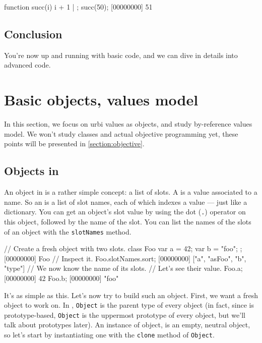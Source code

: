 \begin{urbiscript}
function succ(i) { i + 1 } | {};
succ(50);
[00000000] 51
\end{urbiscript}

\section{Conclusion}

You're now up and running with basic \us code, and we can dive in
details into advanced \us code.

\chapter{Basic objects, \us values model} %

In this section, we focus on urbi values as objects, and study \us
by-reference values model. We won't study classes and actual objective
programming yet, these points will be presented in
\autoref{section:objective}.

\section{Objects in \us}
\label{sec:tut:objects}
An object in \us is a rather simple concept: a list of slots. A
 is a value associated to a name. So an  is a
list of slot names, each of which indexes a value --- just like a
dictionary. You can get an object's slot value by using the dot
(\lstinline{.}) operator on this object, followed by the name of the
slot. You can list the names of the slots of an object with the
\lstinline{slotNames} method.

\begin{urbiscript}
// Create a fresh object with two slots.
class Foo { var a = 42; var b = "foo"; };
[00000000] Foo
// Inspect it.
Foo.slotNames.sort;
[00000000] ["a", "asFoo", "b", "type"]
// We now know the name of its slots.
// Let's see their value.
Foo.a;
[00000000] 42
Foo.b;
[00000000] "foo"
\end{urbiscript}

It's as simple as this. Let's now try to build such an object. First,
we want a fresh object to work on. In \us, \lstinline{Object} is the
parent type of every object (in fact, since \us is prototype-based,
\lstinline{Object} is the uppermost prototype of every object, but
we'll talk about prototypes later). An instance of object, is an
empty, neutral object, so let's start by instantiating one with the
\lstinline{clone} method of \lstinline{Object}.

